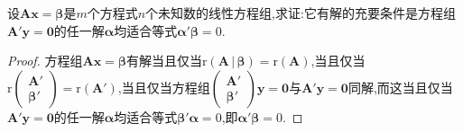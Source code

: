 \documentclass[../../main.tex]{subfiles}
\begin{document}
\begin{example}
设\(\boldsymbol{A}\boldsymbol{x}=\boldsymbol{\beta}\)是\(m\)个方程式\(n\)个未知数的线性方程组,求证:它有解的充要条件是方程组\(\boldsymbol{A}'\boldsymbol{y}=\boldsymbol{0}\)的任一解\(\boldsymbol{\alpha}\)均适合等式\(\boldsymbol{\alpha}'\boldsymbol{\beta}=0\).
\end{example}
\begin{proof}
方程组\(\boldsymbol{A}\boldsymbol{x}=\boldsymbol{\beta}\)有解当且仅当\(\mathrm{r}\left( \boldsymbol{A}\,|\,\boldsymbol{\beta } \right) =\mathrm{r}(\boldsymbol{A})\),当且仅当\(\mathrm{r}\begin{pmatrix}
\boldsymbol{A}'\\
\boldsymbol{\beta}'
\end{pmatrix}=\mathrm{r}(\boldsymbol{A}')\),当且仅当方程组\(\begin{pmatrix}
\boldsymbol{A}'\\
\boldsymbol{\beta}'
\end{pmatrix}\boldsymbol{y}=\boldsymbol{0}\)与\(\boldsymbol{A}'\boldsymbol{y}=\boldsymbol{0}\)同解,而这当且仅当\(\boldsymbol{A}'\boldsymbol{y}=\boldsymbol{0}\)的任一解\(\boldsymbol{\alpha}\)均适合等式\(\boldsymbol{\beta}'\boldsymbol{\alpha}=0\),即\(\boldsymbol{\alpha}'\boldsymbol{\beta}=0\).
\end{proof}
\end{document}
